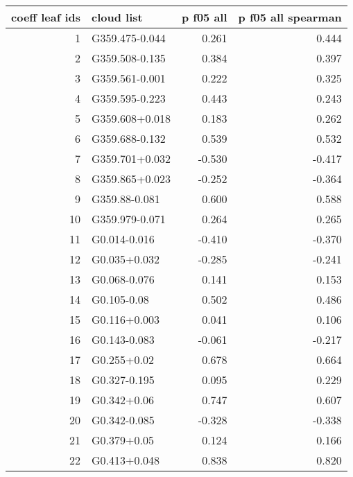 \begin{tabular}{rlrr}
\toprule
 coeff leaf ids &     cloud list &  p f05 all &  p f05 all spearman \\
\midrule
              1 & G359.475-0.044 &      0.261 &               0.444 \\
              2 & G359.508-0.135 &      0.384 &               0.397 \\
              3 & G359.561-0.001 &      0.222 &               0.325 \\
              4 & G359.595-0.223 &      0.443 &               0.243 \\
              5 & G359.608+0.018 &      0.183 &               0.262 \\
              6 & G359.688-0.132 &      0.539 &               0.532 \\
              7 & G359.701+0.032 &     -0.530 &              -0.417 \\
              8 & G359.865+0.023 &     -0.252 &              -0.364 \\
              9 &  G359.88-0.081 &      0.600 &               0.588 \\
             10 & G359.979-0.071 &      0.264 &               0.265 \\
             11 &   G0.014-0.016 &     -0.410 &              -0.370 \\
             12 &   G0.035+0.032 &     -0.285 &              -0.241 \\
             13 &   G0.068-0.076 &      0.141 &               0.153 \\
             14 &    G0.105-0.08 &      0.502 &               0.486 \\
             15 &   G0.116+0.003 &      0.041 &               0.106 \\
             16 &   G0.143-0.083 &     -0.061 &              -0.217 \\
             17 &    G0.255+0.02 &      0.678 &               0.664 \\
             18 &   G0.327-0.195 &      0.095 &               0.229 \\
             19 &    G0.342+0.06 &      0.747 &               0.607 \\
             20 &   G0.342-0.085 &     -0.328 &              -0.338 \\
             21 &    G0.379+0.05 &      0.124 &               0.166 \\
             22 &   G0.413+0.048 &      0.838 &               0.820 \\

\end{tabular}
